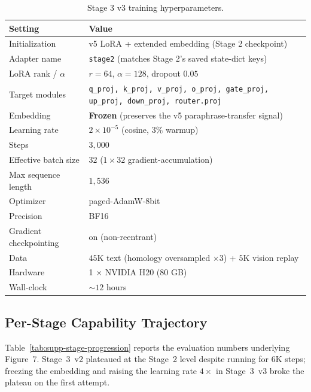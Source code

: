 \documentclass[11pt]{article}
\begin{document}
\begin{table}[H]
\centering
\small
\caption{Stage 3 v3 training hyperparameters.}
\label{tab:supp-mm-hparams}
\begin{tabular}{ll}
\toprule
\textbf{Setting} & \textbf{Value} \\
\midrule
Initialization                  & v5 LoRA + extended embedding (Stage 2 checkpoint) \\
Adapter name                    & \texttt{stage2} (matches Stage 2's saved state-dict keys) \\
LoRA rank / $\alpha$            & $r{=}64$, $\alpha{=}128$, dropout $0.05$ \\
Target modules                  & \texttt{q\_proj, k\_proj, v\_proj, o\_proj, gate\_proj, up\_proj, down\_proj, router.proj} \\
Embedding                       & \textbf{Frozen} (preserves the v5 paraphrase-transfer signal) \\
Learning rate                   & $2\!\times\!10^{-5}$ (cosine, $3\%$ warmup) \\
Steps                           & $3{,}000$ \\
Effective batch size            & $32$ ($1 \times 32$ gradient-accumulation) \\
Max sequence length             & $1{,}536$ \\
Optimizer                       & paged-AdamW-8bit \\
Precision                       & BF16 \\
Gradient checkpointing          & on (non-reentrant) \\
Data                            & $45$K text (homology oversampled $\times 3$) + $5$K vision replay \\
Hardware                        & 1 $\times$ NVIDIA H20 (80 GB) \\
Wall-clock                      & $\sim 12$ hours \\
\bottomrule
\end{tabular}
\end{table}

\subsection{Per-Stage Capability Trajectory}

Table~\ref{tab:supp-stage-progression} reports the evaluation numbers underlying
Figure~7. Stage~3~v2 plateaued at the Stage~2 level despite running for $6$K
steps; freezing the embedding and raising the learning rate $4\times$ in
Stage~3~v3 broke the plateau on the first attempt.
\end{document}
